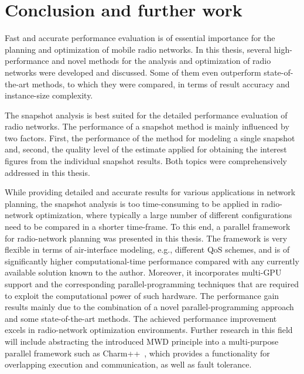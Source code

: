 
\chapter{Conclusion and further work \label{chap:Conclusion}}

Fast and accurate performance evaluation is of essential importance
for the planning and optimization of mobile radio networks. In this
thesis, several high-performance and novel methods for the analysis
and optimization of radio networks were developed and discussed. Some
of them even outperform state-of-the-art methods, to which they were
compared, in terms of result accuracy and instance-size complexity.

The snapshot analysis is best suited for the detailed performance
evaluation of radio networks. The performance of a snapshot method
is mainly influenced by two factors. First, the performance of the
method for modeling a single snapshot and, second, the quality level
of the estimate applied for obtaining the interest figures from the
individual snapshot results. Both topics were comprehensively addressed
in this thesis.

While providing detailed and accurate results for various applications
in network planning, the snapshot analysis is too time-consuming to
be applied in radio-network optimization, where typically a large
number of different configurations need to be compared in a shorter
time-frame. To this end, a parallel framework for radio-network planning
was presented in this thesis. The framework is very flexible in terms
of air-interface modeling, e.g., different QoS schemes, and is of
significantly higher computational-time performance compared with
any currently available solution known to the author. Moreover, it
incorporates multi-GPU support and the corresponding parallel-programming
techniques that are required to exploit the computational power of
such hardware. The performance gain results mainly due to the combination
of a novel parallel-programming approach and some state-of-the-art
methods. The achieved performance improvement excels in radio-network
optimization environments. Further research in this field will include
abstracting the introduced MWD principle into a multi-purpose parallel
framework such as Charm++~\cite{Kale-The_Charm_Approach:2013}, which
provides a functionality for overlapping execution and communication,
as well as fault tolerance.

